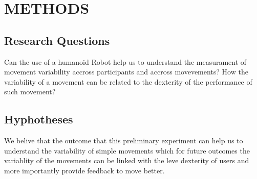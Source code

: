 \documentclass{sig-alternate-05-2015}
\begin{document}





% 
% 
% 







\section{METHODS}

\subsection{Research Questions}

Can the use of a humanoid Robot help us to understand the measurament of movement variability
accross participants and accross movevements?
How the variability of a movement can be related to the dexterity of the performance
of such movement?


\subsection{Hyphotheses}
 We belive that the outcome that this preliminary experiment 
  can help us to understand the variability of simple movements
  which for future outcomes the variablity of the movements
  can be linked with the leve dexterity of users and more 
  importantly provide feedback to move better.
\end{document}
